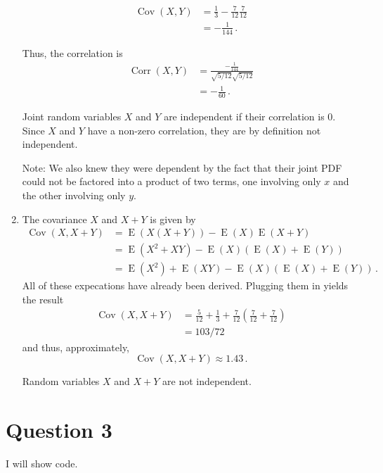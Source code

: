 \documentclass[12pt]{fphw}
\newcommand{\expect}{\operatorname{E}}
\newcommand{\corr}{\operatorname{Corr}}
\newcommand{\cov}{\operatorname{Cov}}
\begin{document}
\begin{enumerate}
	\begin{align}
		\cov(X,Y) &= \frac{1}{3} - \frac{7}{12} \frac{7}{12}\\
				  &= -\frac{1}{144}\,.
	\end{align}
	
	Thus, the correlation is
	\begin{align}
		\corr(X,Y) &= \frac{-\frac{1}{144}}{\sqrt{5/12}\sqrt{5/12}}\\
				   &= -\frac{1}{60}\,.
	\end{align}
	
	Joint random variables $X$ and $Y$ are independent if their correlation is $0$.
	Since $X$ and $Y$ have a non-zero correlation, they are by definition not independent.
	
	Note: We also knew they were dependent by the fact that their joint PDF could not be factored
	into a product of two terms, one involving only $x$ and the other involving only $y$.
	
	\item The covariance $X$ and $X+Y$ is given by
	\begin{align}
		\cov(X,X+Y)
			&= \expect(X (X+Y)) - \expect(X)\expect(X+Y)\\
			&= \expect(X^2 + X Y) - \expect(X)(\expect(X)+\expect(Y))\\
			&= \expect(X^2) + \expect(X Y) - \expect(X)(\expect(X)+\expect(Y))\,.
	\end{align}
	All of these expecations have already been derived.
	Plugging them in yields the result
	\begin{align}
		\cov(X,X+Y) &= \frac{5}{12} + \frac{1}{3} + \frac{7}{12}\left(\frac{7}{12}+\frac{7}{12}\right)\\
		            &= 103/72
	\end{align}
	and thus, approximately,
	\begin{equation}
		\cov(X,X+Y) \approx 1.43\,.
	\end{equation}

	Random variables $X$ and $X+Y$ are not independent.	
\end{enumerate}


\section*{Question 3}

\begin{problem}
	I will show code.
\end{problem}
\end{document}
